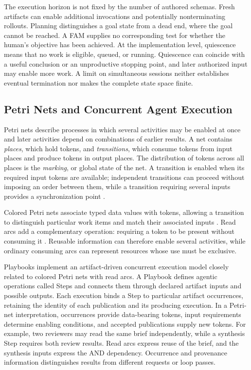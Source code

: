 \documentclass[letterpaper]{article}
\theoremstyle{definition}
\begin{document}
The execution horizon is not fixed by the number of authored schemas.
Fresh artifacts can enable additional invocations and potentially
nonterminating rollouts. Planning distinguishes a goal state from a dead end,
where the goal cannot be reached. A FAM supplies no corresponding test for
whether the human's objective has been achieved. At the implementation level,
quiescence means that no work is eligible, queued, or running. Quiescence can
coincide with a useful conclusion or an unproductive stopping point, and later
authorized input may enable more work. A limit on simultaneous sessions
neither establishes eventual termination nor makes the complete state space
finite.

\subsection{Petri Nets and Concurrent Agent Execution}

Petri nets describe processes in which several activities may be enabled at
once and later activities depend on combinations of earlier results. A net
contains \emph{places}, which hold tokens, and \emph{transitions}, which consume
tokens from input places and produce tokens in output places. The distribution
of tokens across all places is the \emph{marking}, or global state of the net.
A transition is enabled when its required input tokens are available;
independent transitions can proceed without imposing an order between them,
while a transition requiring several inputs provides a synchronization point
\cite{jensen1994coloured}.

Colored Petri nets associate typed data values with tokens, allowing a
transition to distinguish particular work items and match their associated
inputs \cite{jensen1994coloured}. Read arcs add a complementary operation:
requiring a token to be present without consuming it
\cite{rodriguez2012readarcs}. Reusable information can therefore enable several
activities, while ordinary consuming arcs can represent resources whose use
must be exclusive.

Playbooks implement an artifact-driven concurrent execution model closely
related to colored Petri nets with read arcs. A Playbook defines agentic
operations called Steps and connects them through declared artifact inputs and
possible outputs. Each execution binds a Step to particular artifact
occurrences, retaining the identity of each publication and its producing
execution. In a Petri-net interpretation, occurrences provide data-bearing
tokens, input requirements determine enabling conditions, and accepted
publications supply new tokens. For example, two reviewers may read the same
brief independently, while a synthesis Step requires both review results.
Read arcs express reuse of the brief, and the synthesis inputs express the
AND dependency. Occurrence and provenance information distinguishes results
from different requests or loop passes.
\end{document}
